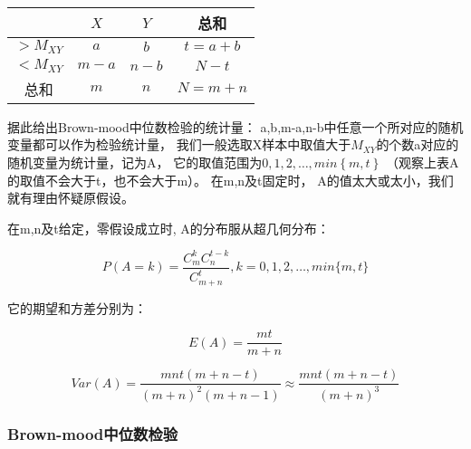 \documentclass[UTF8]{ctexart}
\numberwithin{equation}{section}
\begin{document}
\begin{center}
    \begin{tabular}{cccc}
        \toprule
        & $X$ & $Y$ & 总和 \\
        \midrule
        $> M_{XY}$ & $a$ & $b$ & $t = a+b$ \\
        $< M_{XY}$ & $m-a$ & $n-b$ & $N-t$ \\
        \midrule
        总和 & $m$ & $n$ & $N = m+n$ \\
        \bottomrule
    \end{tabular}
\end{center}

据此给出Brown-mood中位数检验的统计量：
a,b,m-a,n-b中任意一个所对应的随机变量都可以作为检验统计量，
我们一般选取X样本中取值大于$M_{XY}$的个数a对应的随机变量为统计量，记为A，
它的取值范围为$0,1,2, \dots, min \left\{ m, t \right\}$
（观察上表A的取值不会大于t，也不会大于m）。
在m,n及t固定时，
A的值太大或太小，我们就有理由怀疑原假设。

在m,n及t给定，零假设成立时, A的分布服从超几何分布：

\begin{equation}
    P(A = k) = \dfrac{C_m^k C_n^{t-k}}{C_{m+n}^t},k=0,1,2,\dots,min\{m,t\}
    \nonumber
\end{equation}

它的期望和方差分别为：

\begin{equation}
    E(A) = \dfrac{mt}{m+n}
    \nonumber
\end{equation}

\begin{equation}
    Var(A) = \dfrac{mnt(m+n-t)}{(m+n)^2(m+n-1)} \approx \dfrac{mnt(m+n-t)}{(m+n)^3}
    \nonumber
\end{equation}


\subsubsection{Brown-mood中位数检验}
\end{document}
